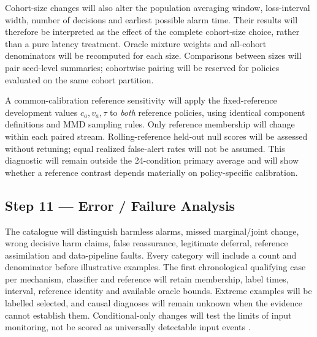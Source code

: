 \documentclass[11pt,a4paper]{article}
\begin{document}
Cohort-size changes will also alter the population averaging window,
loss-interval width, number of decisions and earliest possible alarm time.
Their results will therefore be interpreted as the effect of the complete
cohort-size choice, rather than a pure latency treatment. Oracle mixture
weights and all-cohort denominators will be recomputed for each size.
Comparisons between sizes will pair seed-level summaries; cohortwise pairing
will be reserved for policies evaluated on the same cohort partition.

A common-calibration reference sensitivity will apply the fixed-reference
development values $c_a,v_a,\tau$ to \emph{both} reference policies, using
identical component definitions and MMD sampling rules. Only reference
membership will change within each paired stream. Rolling-reference held-out
null scores will be assessed without retuning; equal realized false-alert
rates will not be assumed. This diagnostic will remain outside the 24-condition
primary average and will show whether a reference contrast depends materially
on policy-specific calibration.

\subsection*{Step 11 --- Error / Failure Analysis}
The catalogue will distinguish harmless alarms, missed marginal/joint change,
wrong decisive harm claims, false reassurance, legitimate deferral, reference
assimilation and data-pipeline faults. Every category will include a count and
denominator before illustrative examples. The first chronological qualifying
case per mechanism, classifier and reference will retain membership, label
times, interval, reference identity and available oracle bounds. Extreme
examples will be labelled selected, and causal diagnoses will remain unknown
when the evidence cannot establish them. Conditional-only changes will test
the limits of input monitoring, not be scored as universally detectable input
events \cite{window,souza,nist}.
\end{document}

